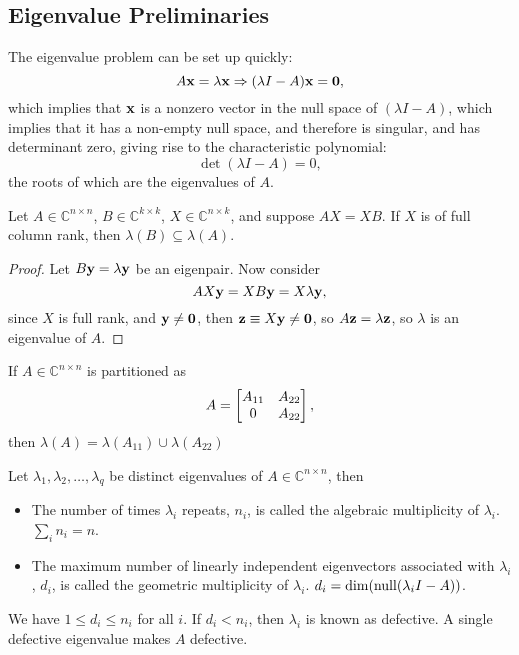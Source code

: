 \documentclass{article}
\begin{document}
\subsection{Eigenvalue Preliminaries}
The eigenvalue problem can be set up quickly:
\begin{equation}
    A\bm{\mathrm{x}}=\lambda\bm{\mathrm{x}}\Rightarrow(\lambda I-A)\bm{\mathrm{x}}=\bm{\mathrm{0}},
\end{equation}
which implies that $\bm{\mathrm{x}}$ is a nonzero vector in the null space of $(\lambda I-A)$, which implies that it has a non-empty null space, and therefore is singular, and has determinant zero, giving rise to the characteristic polynomial:
\begin{equation}
    \det(\lambda I-A)=0,
\end{equation}
the roots of which are the eigenvalues of $A$.
\begin{theorem}
    Let $A\in\mathbb{C}^{n\times n}$, $B\in\mathbb{C}^{k\times k}$, $X\in\mathbb{C}^{n\times k}$, and suppose $AX=XB$. If $X$ is of full column rank, then $\lambda(B)\subseteq\lambda(A)$.
\end{theorem}

\begin{proof}
    Let $B\bm{\mathrm{y}}=\lambda\bm{\mathrm{y}}$ be an eigenpair. Now consider
    \begin{equation}
        AX\bm{\mathrm{y}}=XB\bm{\mathrm{y}}=X\lambda\bm{\mathrm{y}},
    \end{equation}
    since $X$ is full rank, and $\bm{\mathrm{y}}\neq\bm{\mathrm{0}}$, then $\bm{\mathrm{z}}\equiv X\bm{\mathrm{y}}\neq\bm{\mathrm{0}}$, so $A\bm{\mathrm{z}}=\lambda\bm{\mathrm{z}}$, so $\lambda$ is an eigenvalue of $A$.
\end{proof}

\begin{property}
    If $A\in\mathbb{C}^{n\times n}$ is partitioned as 
    \begin{equation}
        A=\begin{bmatrix}{A_{11}}&{A_{22}}\\{0}&{A_{22}}\end{bmatrix},
    \end{equation}
    then $\lambda(A)=\lambda(A_{11})\cup\lambda(A_{22})$
\end{property}

\begin{definition}
Let $\lambda_1,\lambda_2,\dots,\lambda_q$ be distinct eigenvalues of $A\in\mathbb{C}^{n\times n}$, then
    \begin{itemize}
        \item The number of times $\lambda_i$ repeats, $n_i$, is called the algebraic multiplicity of $\lambda_i$. $\sum_in_i=n$.
        \item The maximum number of linearly independent eigenvectors associated with $\lambda_i$, $d_i$, is called the geometric multiplicity of $\lambda_i$. $d_i=\dim(\operatorname{null}(\lambda_i I-A))$.
    \end{itemize}
    We have $1\leq d_i\leq n_i$ for all $i$. If $d_i<n_i$, then $\lambda_i$ is known as defective. A single defective eigenvalue makes $A$ defective.
\end{definition}
\end{document}
